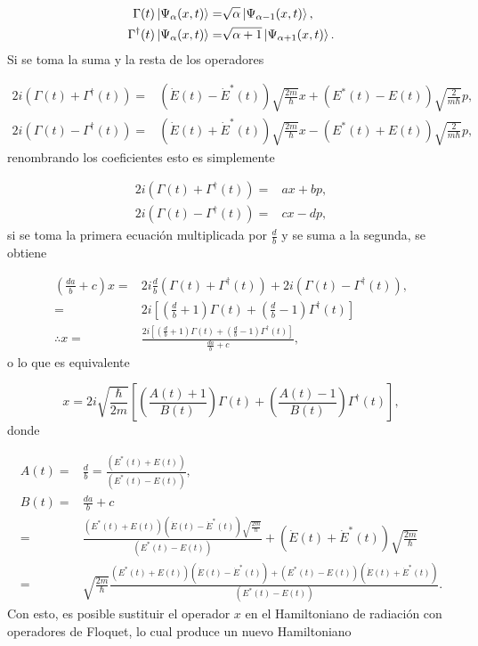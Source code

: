 \documentclass[a4paper,10pt]{report}
\begin{document}
\begin{align*}
\Gamma(t) \Ket{\Psi_\alpha (x,t)} =& \sqrt{\alpha}\Ket{\Psi_{\alpha-1} (x,t)}, \\
\Gamma^\dagger(t) \Ket{\Psi_\alpha (x,t)} =& \sqrt{\alpha+1}\Ket{\Psi_{\alpha+1} (x,t)}.
\end{align*}Si se toma la suma y la resta de los operadores

\begin{align*}
2i(\Gamma (t) + \Gamma ^\dagger (t)) =& (\dot{E} (t) - \dot{E}^* (t)) \sqrt{\frac{2m}{\hbar}}x + (E^* (t) - E (t))\sqrt{\frac{2}{m\hbar}} p, \\
2i(\Gamma (t) - \Gamma ^\dagger (t)) =& (\dot{E} (t) + \dot{E}^* (t)) \sqrt{\frac{2m}{\hbar}}x -(E^* (t) + E (t))\sqrt{\frac{2}{m\hbar}} p,
\end{align*} renombrando los coeficientes esto es simplemente

\begin{align*}
2i(\Gamma (t) + \Gamma ^\dagger (t)) =& ax + bp, \\
2i(\Gamma (t) - \Gamma ^\dagger (t)) =& cx - dp,
\end{align*} si se toma la primera ecuación multiplicada por $\frac{d}{b}$ y se suma a la segunda, se obtiene

\begin{align*}
(\frac{da}{b}+c)x =& 2i \frac{d}{b}(\Gamma (t) + \Gamma ^\dagger (t)) + 2i(\Gamma (t) - \Gamma ^\dagger (t)), \\
=&2i[(\frac{d}{b}+1)\Gamma (t)+(\frac{d}{b}-1)\Gamma^\dagger (t)]\\
\therefore x =& \frac{2i[(\frac{d}{b}+1)\Gamma (t)+(\frac{d}{b}-1)\Gamma^\dagger (t)]}{\frac{da}{b}+c},
\end{align*} o lo que es equivalente

\begin{equation}
x = 2i \sqrt{\frac{\hbar}{2m}}[(\frac{A(t) +1}{B(t)})\Gamma (t) +(\frac{A(t) -1}{B(t)})\Gamma^\dagger (t)],
\end{equation} donde

\begin{align}
A(t) =& \frac{d}{b} = \frac{(E^* (t) + E (t))}{(E^* (t) - E (t))}, \\
B(t) = & \frac{da}{b}+c \\
=& \frac{(E^* (t) + E (t))(\dot{E} (t) - \dot{E}^* (t)) \sqrt{\frac{2m}{\hbar}}}{(E^* (t) - E (t))} + (\dot{E} (t) + \dot{E}^* (t)) \sqrt{\frac{2m}{\hbar}}\\
=&\sqrt{\frac{2m}{\hbar}}\frac{(E^* (t) + E (t))(\dot{E} (t) - \dot{E}^* (t))+(E^* (t) - E (t))(\dot{E} (t) + \dot{E}^* (t))}{(E^* (t) - E (t))}.
\end{align}Con esto, es posible sustituir el operador $x$ en el Hamiltoniano de radiación con operadores de Floquet, lo cual produce un nuevo Hamiltoniano
\end{document}
